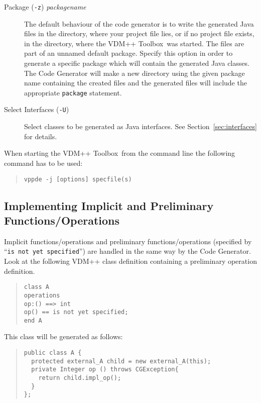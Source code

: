\documentclass[\pformat,11pt]{article}
\newcommand{\ToolboxName}{VDM++ Toolbox}
\newcommand{\tcg}{the Code Generator}
\begin{document}
\begin{description}
\item [Package (\texttt{-z}) \textit{packagename}] 
  The default behaviour of the code
  generator is to write the generated Java files in the directory,
  where your project file lies, or if no project file exists, in the
  directory, where the \ToolboxName\ was started. The files are part
  of an unnamed default package. Specify this
  option in order to generate a specific package
  which will contain the generated Java classes. The Code Generator
  will make a new directory using the given package name containing the
  created files and the generated files will include the appropriate
  \texttt{package} statement.%
\item [Select Interfaces (\texttt{-U})]
  Select classes to be generated as Java interfaces. See
  Section~\ref{sec:interfaces} for details.
\end{description}

When starting the \ToolboxName\ from the command line the following
command has to be used:  

\begin{quote}
\begin{verbatim}
vppde -j [options] specfile(s)
\end{verbatim}
\end{quote}


\subsection{Implementing Implicit and Preliminary Functions/Operations}\label{implicit}

Implicit functions/operations and preliminary functions/operations
(specified by ``{\tt is not yet specified}'') are handled in the same
way by \tcg{}. Look at the following VDM++ class definition containing
a preliminary operation definition.

\begin{quote}
\begin{verbatim}
class A
operations
op:() ==> int
op() == is not yet specified;
end A
\end{verbatim}
\end{quote}

This class will be generated as follows:

\begin{quote}
\begin{verbatim}
public class A {
  protected external_A child = new external_A(this);
  private Integer op () throws CGException{
    return child.impl_op();
  }
};
\end{verbatim}
\end{quote}
\end{document}
